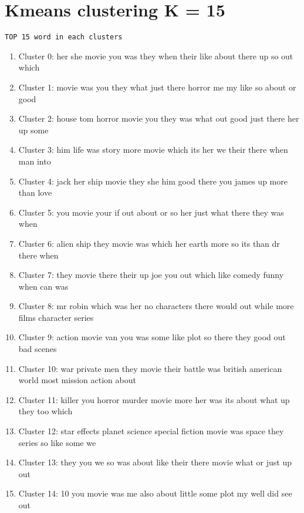 \documentclass[11pt]{article}
\providecommand{\tightlist}{%
      \setlength{\itemsep}{0pt}\setlength{\parskip}{0pt}}
\begin{document}
    \section{Kmeans clustering K = 15}\label{kmeans-clustering-k-15}

\begin{verbatim}
TOP 15 word in each clusters
\end{verbatim}

\begin{enumerate}
\def\labelenumi{\arabic{enumi}.}
\tightlist
\item
  Cluster 0: her she movie you was they when their like about there up
  so out which
\item
  Cluster 1: movie was you they what just there horror me my like so
  about or good
\item
  Cluster 2: house tom horror movie you they was what out good just
  there her up some
\item
  Cluster 3: him life was story more movie which its her we their there
  when man into
\item
  Cluster 4: jack her ship movie they she him good there you james up
  more than love
\item
  Cluster 5: you movie your if out about or so her just what there they
  was when
\item
  Cluster 6: alien ship they movie was which her earth more so its than
  dr there when
\item
  Cluster 7: they movie there their up joe you out which like comedy
  funny when can was
\item
  Cluster 8: mr robin which was her no characters there would out while
  more films character series
\item
  Cluster 9: action movie van you was some like plot so there they good
  out bad scenes
\item
  Cluster 10: war private men they movie their battle was british
  american world most mission action about
\item
  Cluster 11: killer you horror murder movie more her was its about what
  up they too which
\item
  Cluster 12: star effects planet science special fiction movie was
  space they series so like some we
\item
  Cluster 13: they you we so was about like their there movie what or
  just up out
\item
  Cluster 14: 10 you movie was me also about little some plot my well
  did see out
\end{enumerate}
\end{document}
